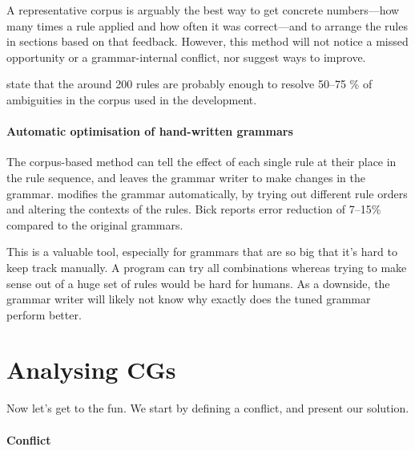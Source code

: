 A representative corpus is arguably the best way to get concrete numbers---how many times a rule applied and how often it was correct---and to arrange the rules in sections based on that feedback.
However, this method will not notice a missed opportunity or a grammar-internal conflict, nor suggest ways to improve.

\cite{voutilainen2004} state that the around 200 rules are probably enough to resolve 50--75 \% of ambiguities in the corpus used in the development. 


\paragraph{Automatic optimisation of hand-written grammars }

The corpus-based method can tell the effect of each single rule at their place in the rule sequence, and leaves the grammar writer to make changes in the grammar.
\cite{bick2013tuning} modifies the grammar automatically, by trying
out different rule orders and altering the contexts of the rules. 
Bick reports error reduction of 7--15\% compared to the original grammars.

This is a valuable tool, especially for grammars that are so big that it's hard to keep track manually. A program can try all combinations whereas trying to make sense out of a huge set of rules would be hard for humans.
As a downside, the grammar writer will likely not know why exactly does the tuned grammar perform better.


\section{Analysing CGs}
\label{sec:sectionCGana}

Now let's get to the fun. We start by defining a conflict, and present our solution.

\paragraph{Conflict}

